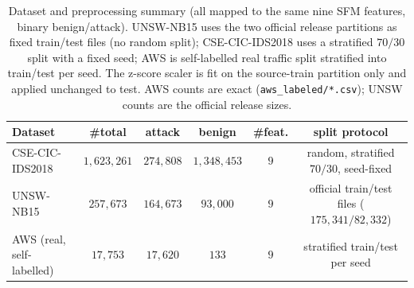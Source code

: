 \documentclass[11pt,a4paper]{article}
\begin{document}
\begin{table}[h]
\centering
\caption{Dataset and preprocessing summary (all mapped to the same nine SFM
features, binary benign/attack). UNSW-NB15 uses the two official release partitions
as fixed train/test files (no random split); CSE-CIC-IDS2018 uses a stratified
$70/30$ split with a fixed seed; AWS is self-labelled real traffic split stratified
into train/test per seed. The z-score scaler is fit on the source-train partition
only and applied unchanged to test. AWS counts are exact
(\texttt{aws\_labeled/*.csv}); UNSW counts are the official release sizes.}
\label{tab:dataset}
\small
\begin{tabular}{lccccc}
\toprule
Dataset & \#total & attack & benign & \#feat. & split protocol \\
\midrule
CSE-CIC-IDS2018~\cite{sharafaldin2018} & $1{,}623{,}261$ & $274{,}808$ & $1{,}348{,}453$ & $9$ & random, stratified $70/30$, seed-fixed \\
UNSW-NB15~\cite{moustafa2015}          & $257{,}673$ & $164{,}673$ & $93{,}000$ & $9$ & official train/test files ($175{,}341/82{,}332$) \\
AWS (real, self-labelled)              & $17{,}753$ & $17{,}620$ & $133$ & $9$ & stratified train/test per seed \\
\bottomrule
\end{tabular}

\vspace{0.3em}
\end{table}
\end{document}
